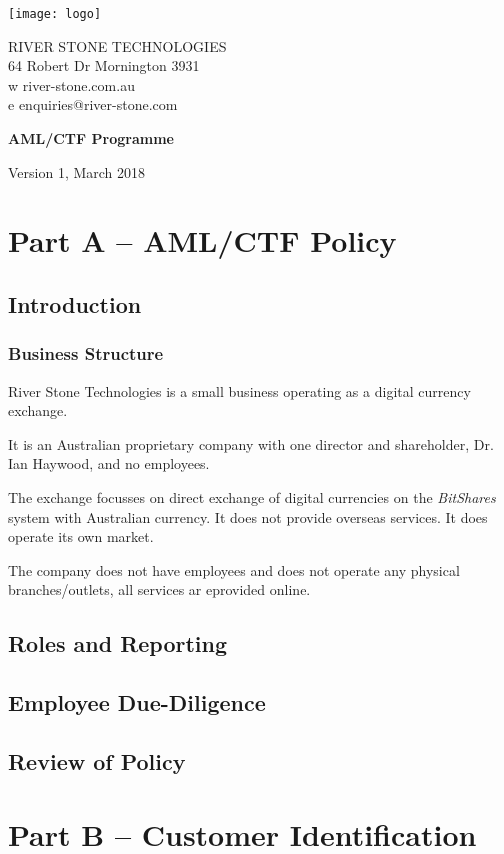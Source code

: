 \documentclass[12pt]{report}
\begin{document}
\texttt{[image: logo]} \parbox[b]{5in}{\sffamily RIVER STONE TECHNOLOGIES \\
  64 Robert Dr Mornington 3931\\ w river-stone.com.au \\ e enquiries@river-stone.com }

\rmfamily
\vspace{1.5in}

\begin{center}
  {\Huge \bfseries AML/CTF Programme}
  \vspace{1in}

  {\large Version 1, March 2018}
 \end{center}
\setcounter{page}{1}                    %



\renewcommand{\thechapter}{A}%
\chapter*{Part A -- AML/CTF Policy}

\section{Introduction}

\subsection{Business Structure}

River Stone Technologies is  a small business operating as a digital currency exchange.

It is an Australian proprietary company with one director and shareholder,
Dr. Ian Haywood, and no employees.

The exchange focusses on direct exchange of digital currencies on
the \emph{BitShares} system with Australian currency. It does
not provide overseas services. It does operate its own market.

The company does not have employees and does not operate any physical
branches/outlets, all services ar eprovided online.

\section{Roles and Reporting}

\section{Employee Due-Diligence}

\section{Review of Policy}

\renewcommand{\thechapter}{B}%
\chapter*{Part B -- Customer Identification}
\end{document}
